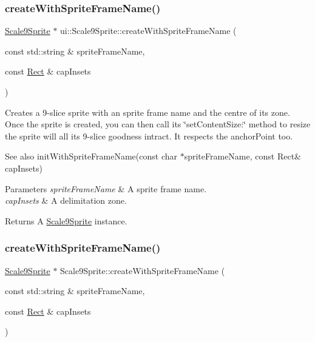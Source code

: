\subsubsection{\texorpdfstring{create\+With\+Sprite\+Frame\+Name()}{createWithSpriteFrameName()}\hspace{0.1cm}{\footnotesize\ttfamily [3/4]}}
{\footnotesize\ttfamily \hyperlink{classui_1_1Scale9Sprite}{Scale9\+Sprite} $\ast$ ui\+::\+Scale9\+Sprite\+::create\+With\+Sprite\+Frame\+Name (\begin{DoxyParamCaption}\item[{const std\+::string \&}]{sprite\+Frame\+Name,  }\item[{const \hyperlink{classRect}{Rect} \&}]{cap\+Insets }\end{DoxyParamCaption})\hspace{0.3cm}{\ttfamily [static]}}

Creates a 9-\/slice sprite with an sprite frame name and the centre of its zone. Once the sprite is created, you can then call its \char`\"{}set\+Content\+Size\+:\char`\"{} method to resize the sprite will all it\textquotesingle{}s 9-\/slice goodness intract. It respects the anchor\+Point too.

\begin{DoxySeeAlso}{See also}
init\+With\+Sprite\+Frame\+Name(const char $\ast$sprite\+Frame\+Name, const Rect\& cap\+Insets) 
\end{DoxySeeAlso}

\begin{DoxyParams}{Parameters}
{\em sprite\+Frame\+Name} & A sprite frame name. \\
\hline
{\em cap\+Insets} & A delimitation zone. \\
\hline
\end{DoxyParams}
\begin{DoxyReturn}{Returns}
A \hyperlink{classui_1_1Scale9Sprite}{Scale9\+Sprite} instance. 
\end{DoxyReturn}
\mbox{\label{classui_1_1Scale9Sprite_a25cf24a5bd98bfbce50ba7213e98841e}} 
\subsubsection{\texorpdfstring{create\+With\+Sprite\+Frame\+Name()}{createWithSpriteFrameName()}\hspace{0.1cm}{\footnotesize\ttfamily [4/4]}}
{\footnotesize\ttfamily \hyperlink{classui_1_1Scale9Sprite}{Scale9\+Sprite} $\ast$ Scale9\+Sprite\+::create\+With\+Sprite\+Frame\+Name (\begin{DoxyParamCaption}\item[{const std\+::string \&}]{sprite\+Frame\+Name,  }\item[{const \hyperlink{classRect}{Rect} \&}]{cap\+Insets }\end{DoxyParamCaption})\hspace{0.3cm}{\ttfamily [static]}}

